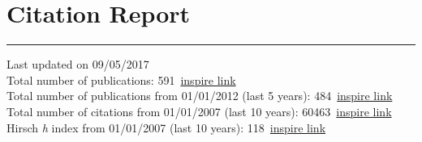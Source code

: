 \documentclass[10pt, a4paper]{article}
\newcommand{\years}[1]{\marginnote{\hskip-0.2in{\scriptsize #1}}}
\begin{document}
\section*{Citation Report}
\vspace{-5pt}
\hrule
\vspace{10pt}
\noindent
Last updated on 09/05/2017\\[1em]
Total number of publications:
591~\href{http://inspirehep.net/search?ln=en&ln=en&p=find+a+santanastasio+and+tc+p+and+date\%3C\%3D2017-05-09&of=hb&action_search=Search&sf=&so=a&rm=&rg=25&sc=0}{inspire
link}\\
Total number of publications from 01/01/2012 (last 5 years): 484~\href{http://inspirehep.net/search?ln=en&ln=en&p=find+a+santanastasio+and+tc+p+and+date\%3C\%3D2017-05-09+and+date\%3E\%3D2012-01-01&of=hb&action_search=Search&sf=&so=a&rm=&rg=25&sc=0}{inspire
link}\\
Total number of citations from 01/01/2007 (last 10 years): 60463~\href{http://inspirehep.net/search?ln=en&ln=en&p=find+a+santanastasio+and+tc+p+and+date\%3E\%3D2007-01-01+and+date\%3C\%3D2017-05-09&of=hcs&action_search=Search&sf=&so=a&rm=&rg=25&sc=0}{inspire
link}\\
Hirsch {\it h} index from 01/01/2007 (last 10 years): 118~\href{http://inspirehep.net/search?ln=en&ln=en&p=find+a+santanastasio+and+tc+p+and+date\%3E\%3D2007-01-01+and+date\%3C\%3D2017-05-09&of=hcs&action_search=Search&sf=&so=a&rm=&rg=25&sc=0}{inspire
link}\\
\end{document}
